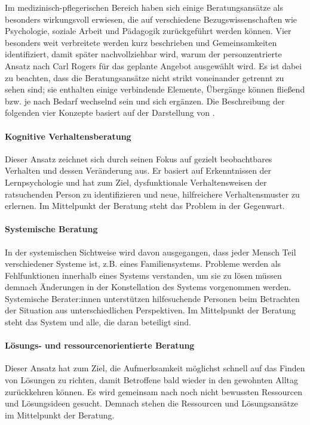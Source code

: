 \documentclass[
  twoside,
  parskip=half-,
  paper=176mm:246mm,
  BCOR=14mm,
  DIV=14,
]{scrreprt}
\begin{document}
Im medizinisch-pflegerischen Bereich haben sich einige Beratungsansätze als besonders wirkungsvoll erwiesen, die auf verschiedene Bezugswissenschaften wie Psychologie, soziale Arbeit und Pädagogik zurückgeführt werden können. Vier besonders weit verbreitete werden kurz beschrieben und Gemeinsamkeiten identifiziert, damit später nachvollziehbar wird, warum der personzentrierte Ansatz nach Carl Rogers für das geplante Angebot ausgewählt wird. Es ist dabei zu beachten, dass die Beratungsansätze nicht strikt voneinander getrennt zu sehen sind; sie enthalten einige verbindende Elemente, Übergänge können fließend bzw. je nach Bedarf wechselnd sein und sich ergänzen. Die Beschreibung der folgenden vier Konzepte basiert auf der Darstellung von \textcite[Kap. 8]{hacker2021}.

\paragraph{Kognitive Verhaltensberatung}

Dieser Ansatz zeichnet sich durch seinen Fokus auf gezielt beobachtbares Verhalten und dessen Veränderung aus. Er basiert auf Erkenntnissen der Lernpsychologie und hat zum Ziel, dysfunktionale Verhaltensweisen der ratsuchenden Person zu identifizieren und neue, hilfreichere Verhaltensmuster zu erlernen. Im Mittelpunkt der Beratung steht das Problem in der Gegenwart.

\paragraph{Systemische Beratung}

In der systemischen Sichtweise wird davon ausgegangen, dass jeder Mensch Teil verschiedener Systeme ist, z.B. eines Familiensystems. Probleme werden als Fehlfunktionen innerhalb eines Systems verstanden, um sie zu lösen müssen demnach Änderungen in der Konstellation des Systems vorgenommen werden. Systemische Berater:innen unterstützen hilfesuchende Personen beim Betrachten der Situation aus unterschiedlichen Perspektiven. Im Mittelpunkt der Beratung steht das System und alle, die daran beteiligt sind.

\paragraph{Lösungs- und ressourcenorientierte Beratung}

Dieser Ansatz hat zum Ziel, die Aufmerksamkeit möglichst schnell auf das Finden von Lösungen zu richten, damit Betroffene bald wieder in den gewohnten Alltag zurückkehren können. Es wird gemeinsam nach noch nicht bewussten Ressourcen und Lösungsideen gesucht. Demnach stehen die Ressourcen und Lösungsansätze im Mittelpunkt der Beratung.
\end{document}
